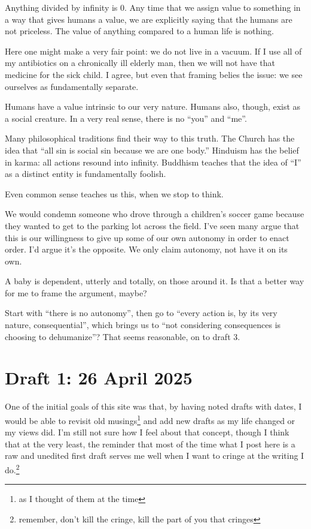 \documentclass[12pt]{article}
\newcommand{\say}[1]{``#1''}
\renewcommand{\,}{\textsuperscript{,}}
\begin{document}
Anything divided by infinity is 0.  
Any time that we assign value to something in a way that gives humans a value, we are explicitly saying that the humans are not priceless.  
The value of anything compared to a human life is nothing.

Here one might make a very fair point: we do not live in a vacuum.  
If I use all of my antibiotics on a chronically ill elderly man, then we will not have that medicine for the sick child.  
I agree, but even that framing belies the issue: we see ourselves as fundamentally separate.

Humans have a value intrinsic to our very nature.  
Humans also, though, exist as a social creature.  
In a very real sense, there is no \say{you} and \say{me}.

Many philosophical traditions find their way to this truth.  
The Church has the idea that \say{all sin is social sin because we are one body.}  
Hinduism has the belief in karma: all actions resound into infinity.  
Buddhism teaches that the idea of \say{I} as a distinct entity is fundamentally foolish.

Even common sense teaches us this, when we stop to think.

We would condemn someone who drove through a children's soccer game because they wanted to get to the parking lot across the field.  
I've seen many argue that this is our willingness to give up some of our own autonomy in order to enact order.  
I'd argue it's the opposite.  
We only claim autonomy, not have it on its own.

A baby is dependent, utterly and totally, on those around it.  
Is that a better way for me to frame the argument, maybe?

Start with \say{there is no autonomy}, then go to \say{every action is, by its very nature, consequential}, which brings us to \say{not considering consequences is choosing to dehumanize}?  
That seems reasonable, on to draft 3.

\section{Draft 1: 26 April 2025}

One of the initial goals of this site was that, by having noted drafts with dates, I would be able to revisit old musings\footnote{as I thought of them at the time} and add new drafts as my life changed or my views did.  
I'm still not sure how I feel about that concept, though I think that at the very least, the reminder that most of the time what I post here is a raw and unedited first draft serves me well when I want to cringe at the writing I do.\footnote{remember, don't kill the cringe, kill the part of you that cringes}
\end{document}
